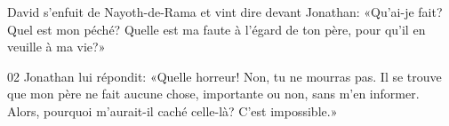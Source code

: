 David s’enfuit de Nayoth-de-Rama et vint dire devant Jonathan: «Qu’ai-je fait? Quel est mon péché? Quelle est ma faute à l’égard de ton père, pour qu’il en veuille à ma vie?»

02 Jonathan lui répondit: «Quelle horreur! Non, tu ne mourras pas. Il se trouve que mon père ne fait aucune chose, importante ou non, sans m’en informer. Alors, pourquoi m’aurait-il caché celle-là? C’est impossible.»
